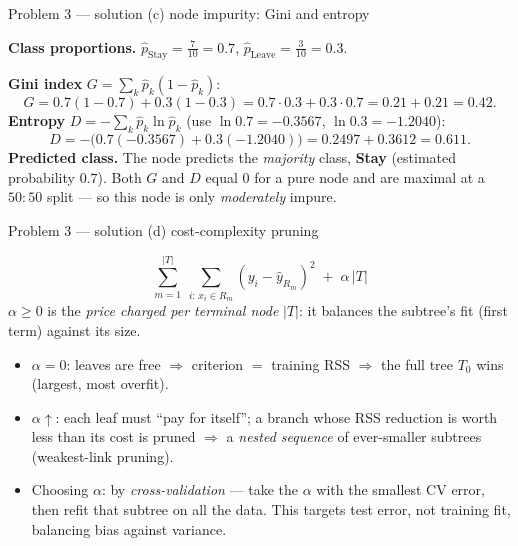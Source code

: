 \documentclass[aspectratio=169,11pt]{beamer}
\begin{document}
\begin{frame}{Problem 3 --- solution (c) node impurity: Gini and entropy}
  \begin{solutionbox}
    \textbf{Class proportions.} $\hat p_{\text{Stay}}=\tfrac{7}{10}=0.7$,\qquad
    $\hat p_{\text{Leave}}=\tfrac{3}{10}=0.3$.
    \medskip

    \textbf{Gini index} $G=\sum_k\hat p_k(1-\hat p_k)$:
    \[
      G=0.7(1{-}0.7)+0.3(1{-}0.3)=0.7\cdot0.3+0.3\cdot0.7=0.21+0.21=\mathbf{0.42}.
    \]
    \textbf{Entropy} $D=-\sum_k\hat p_k\ln\hat p_k$ (use $\ln0.7=-0.3567$, $\ln0.3=-1.2040$):
    \[
      D=-\bigl(0.7(-0.3567)+0.3(-1.2040)\bigr)=0.2497+0.3612=\mathbf{0.611}.
    \]
    \textbf{Predicted class.} The node predicts the \emph{majority} class, \textbf{Stay}
    (estimated probability $0.7$). Both $G$ and $D$ equal $0$ for a pure node and are maximal at a
    $50{:}50$ split --- so this node is only \emph{moderately} impure.
  \end{solutionbox}
\end{frame}

\begin{frame}{Problem 3 --- solution (d) cost-complexity pruning}
  \begin{solutionbox}
    \[
      \sum_{m=1}^{|T|}\ \sum_{i:\,x_i\in R_m}(y_i-\hat y_{R_m})^2\;+\;\alpha\,|T|
    \]
    $\alpha\ge0$ is the \emph{price charged per terminal node} $|T|$: it balances the subtree's
    fit (first term) against its size.
    \begin{itemize}
      \item $\alpha=0$: leaves are free $\Rightarrow$ criterion $=$ training RSS $\Rightarrow$ the
        full tree $T_0$ wins (largest, most overfit).
      \item $\alpha\uparrow$: each leaf must ``pay for itself''; a branch whose RSS reduction is
        worth less than its cost is pruned $\Rightarrow$ a \emph{nested sequence} of ever-smaller
        subtrees (weakest-link pruning).
      \item Choosing $\alpha$: by \emph{cross-validation} --- take the $\alpha$ with the smallest
        CV error, then refit that subtree on all the data. This targets test error, not training
        fit, balancing bias against variance.
    \end{itemize}
  \end{solutionbox}
\end{frame}
\end{document}
